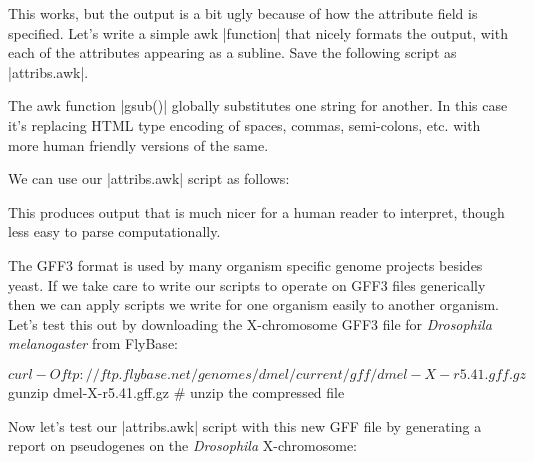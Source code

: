 This works, but the output is a bit ugly because of how the attribute field is specified. Let's write a simple awk |function| that nicely formats the output, with each of the attributes appearing as a subline. Save the following script as |attribs.awk|.


The awk function |gsub()| globally substitutes one string for another. In this case it's replacing HTML type encoding of spaces, commas, semi-colons, etc. with more human friendly versions of the same.

We can use our |attribs.awk| script as follows:

This produces output that is much nicer for a human reader to interpret, though less easy to parse computationally.

The GFF3 format is used by many organism specific genome projects besides yeast. If we take care to write our scripts to operate on GFF3 files generically then we can apply scripts we write for one organism easily to another organism. Let's test this out by downloading the X-chromosome GFF3 file for \textit{Drosophila melanogaster} from FlyBase:

\begin{Code}
$ curl -O ftp://ftp.flybase.net/genomes/dmel/current/gff/dmel-X-r5.41.gff.gz   
$ gunzip dmel-X-r5.41.gff.gz  # unzip the compressed file
\end{Code}

Now let's test our |attribs.awk| script with this new GFF file by generating a report on pseudogenes on the \textit{Drosophila} X-chromosome:

